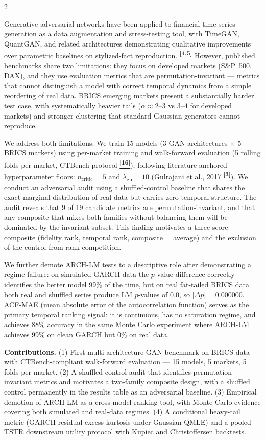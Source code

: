 \documentclass[10pt]{article}
\newcommand{\tcite}[1]{%
  \hyperlink{R:#1}{\textsuperscript{\scriptsize\textbf{[#1]}}}}
\begin{document}
\begin{multicols}{2}

\small
Generative adversarial networks have been applied to financial time series generation as a data augmentation and stress-testing tool, with TimeGAN, QuantGAN, and related architectures demonstrating qualitative improvements over parametric baselines on stylized-fact reproduction.\tcite{4,5} However, published benchmarks share two limitations: they focus on developed markets (S\&P~500, DAX), and they use evaluation metrics that are permutation-invariant --- metrics that cannot distinguish a model with correct temporal dynamics from a simple reordering of real data. BRICS emerging markets present a substantially harder test case, with systematically heavier tails ($\alpha \approx 2$--$3$ vs $3$--$4$ for developed markets) and stronger clustering that standard Gaussian generators cannot reproduce.

We address both limitations. We train 15 models (3 GAN architectures $\times$ 5 BRICS markets) using per-market training and walk-forward evaluation (5 rolling folds per market, CTBench protocol\tcite{16}), following literature-anchored hyperparameter floors: $n_\text{critic}=5$ and $\lambda_\text{gp}=10$ (Gulrajani et al., 2017\tcite{3}). We conduct an adversarial audit using a shuffled-control baseline that shares the exact marginal distribution of real data but carries zero temporal structure. The audit reveals that 9 of 19 candidate metrics are permutation-invariant, and that any composite that mixes both families without balancing them will be dominated by the invariant subset. This finding motivates a three-score composite (fidelity rank, temporal rank, composite = average) and the exclusion of the control from rank competition.

We further demote ARCH-LM tests to a descriptive role after demonstrating a regime failure: on simulated GARCH data the $p$-value difference correctly identifies the better model 99\% of the time, but on real fat-tailed BRICS data both real and shuffled series produce LM $p$-values of 0.0, so $|\Delta p| = 0.000000$. ACF-MAE (mean absolute error of the autocorrelation function) serves as the primary temporal ranking signal: it is continuous, has no saturation regime, and achieves 88\% accuracy in the same Monte Carlo experiment where ARCH-LM achieves 99\% on clean GARCH but 0\% on real data.

\textbf{Contributions.} (1) First multi-architecture GAN benchmark on BRICS data with CTBench-compliant walk-forward evaluation --- 15 models, 5 markets, 5 folds per market. (2) A shuffled-control audit that identifies permutation-invariant metrics and motivates a two-family composite design, with a shuffled control permanently in the results table as an adversarial baseline. (3) Empirical demotion of ARCH-LM as a cross-model ranking tool, with Monte Carlo evidence covering both simulated and real-data regimes. (4) A conditional heavy-tail metric (GARCH residual excess kurtosis under Gaussian QMLE) and a pooled TSTR downstream utility protocol with Kupiec and Christoffersen backtests.

\end{multicols}
\end{document}
